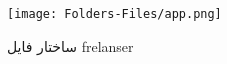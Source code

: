 \begin{figure}[H]
	\texttt{[image: Folders-Files/app.png]}
	\centering
	\caption{ساختار فایل frelanser}
	\label{fig:file:routes:frelanser}
\end{figure}